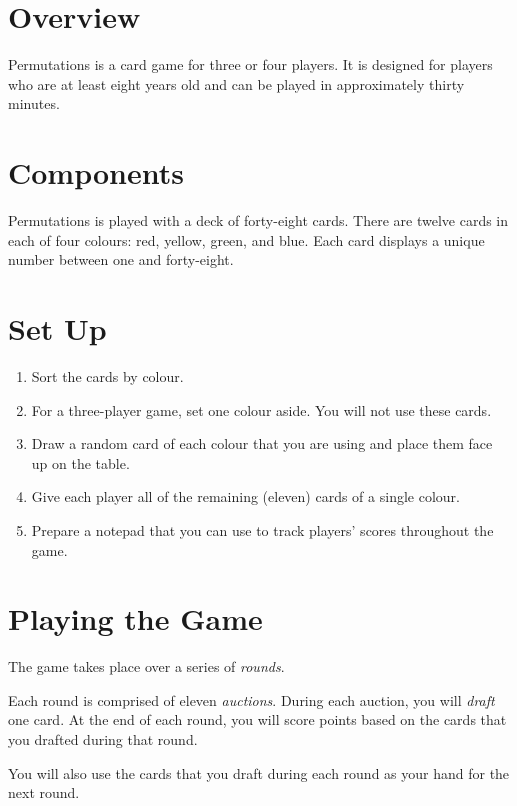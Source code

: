 \documentclass[a6paper, parskip=half, DIV=14, 10pt]{scrartcl}
\begin{document}
\newpage
\setmainfont{Tex Gyre Schola}%
\raggedright%
\section*{Overview}
Permutations is a card game for three or four players.
It is designed for players who are at least eight years old and can be played in
approximately thirty minutes.

\vfill

\section*{Components}
Permutations is played with a deck of forty-eight cards.
There are twelve cards in each of four colours: red, yellow, green, and blue.
Each card displays a unique number between one and forty-eight.

\vfill

\section*{Set Up}
\begin{enumerate}[leftmargin=*]
	\item Sort the cards by colour.
	\item For a three-player game, set one colour aside. You will not use these cards.
	\item Draw a random card of each colour that you are using and place them face up on the table.
	\item Give each player all of the remaining (eleven) cards of a single colour.
	\item Prepare a notepad that you can use to track players' scores throughout the game.
\end{enumerate}

\newpage

\section*{Playing the Game}
The game takes place over a series of \emph{rounds}.

Each round is comprised of eleven \emph{auctions}.
During each auction, you will \emph{draft} one card.
At the end of each round, you will score points based on the cards that you drafted during that round.

You will also use the cards that you draft during each round as your hand for the next round.
\end{document}
